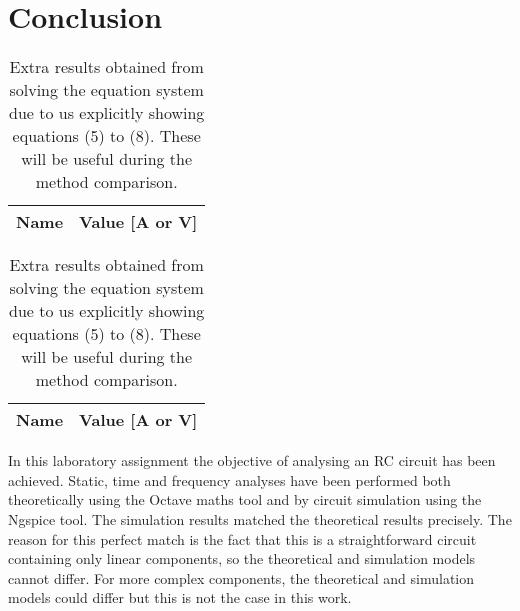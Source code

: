 \section{Conclusion}
\label{sec:conclusion}

\begin{table}[hbt!]
  \centering
  \begin{tabular}{|c|c|}
    \hline    
    {\bf Name} & {\bf Value [A or V]} \\ \hline
    
  \end{tabular}
  \begin{tabular}{|c|c|}
    \hline    
    {\bf Name} & {\bf Value [A or V]} \\ \hline
    
  \end{tabular}
  \caption{Extra results obtained from solving the equation system due to us explicitly showing equations (5) to (8). These will be useful during the method comparison.}
  \label{tab:mesh}
\end{table}

In this laboratory assignment the objective of analysing an RC circuit has been
achieved. Static, time and frequency analyses have been performed both
theoretically using the Octave maths tool and by circuit simulation using the
Ngspice tool. The simulation results matched the theoretical results
precisely. The reason for this perfect match is the fact that this is a
straightforward circuit containing only linear components, so the theoretical
and simulation models cannot differ. For more complex components, the
theoretical and simulation models could differ but this is not the case in this
work.
